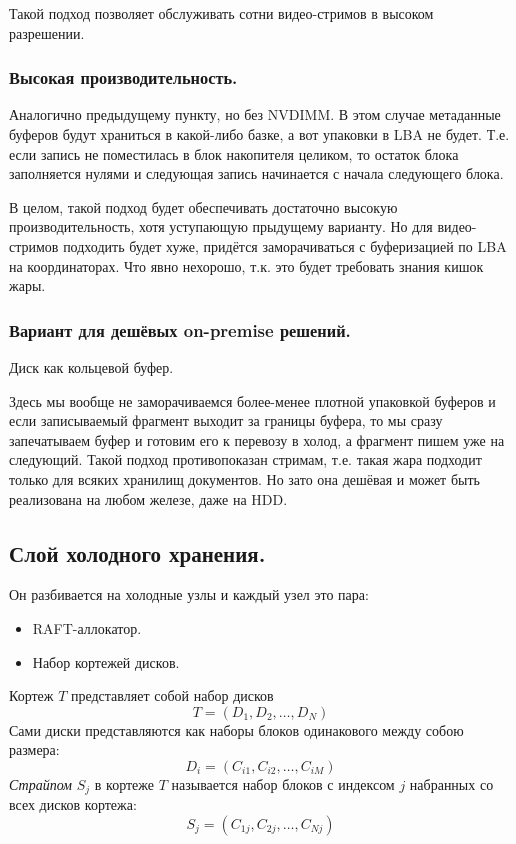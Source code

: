 \documentclass[a4paper,12pt]{article}
\begin{document}
\smallskip
Такой подход позволяет обслуживать сотни видео-стримов в высоком разрешении.

\subsubsection{Высокая производительность.}

Аналогично предыдущему пункту, но без NVDIMM. В этом случае метаданные буферов будут храниться в какой-либо базке, а вот упаковки в LBA не будет. Т.е. если запись не поместилась
в блок накопителя целиком, то остаток блока заполняется нулями и следующая запись начинается с начала следующего блока.

В целом, такой подход будет обеспечивать достаточно высокую производительность, хотя уступающую прыдущему варианту. Но для видео-стримов подходить будет хуже, придётся заморачиваться с
буферизацией по LBA на координаторах. Что явно нехорошо, т.к. это будет требовать знания кишок жары.

\subsubsection{Вариант для дешёвых on-premise решений.}

Диск как кольцевой буфер.
\smallskip

Здесь мы вообще не заморачиваемся более-менее плотной упаковкой буферов и если записываемый фрагмент выходит за границы буфера, то мы сразу запечатываем буфер и готовим его
к перевозу в холод, а фрагмент пишем уже на следующий. Такой подход противопоказан стримам, т.е. такая жара подходит только для всяких хранилищ документов. Но зато она дешёвая и может
быть реализована на любом железе, даже на HDD.

\subsection{Слой холодного хранения.}

Он разбивается на холодные узлы и каждый узел это пара:
\begin{itemize}
\item RAFT-аллокатор.
\item Набор кортежей дисков.
\end{itemize}

Кортеж $T$ представляет собой набор дисков
$$T=\left( D_1, D_2, \dots, D_N \right)$$
Сами диски представляются как наборы блоков одинакового между собою размера:
$$D_i = \left( C_{i1}, C_{i2}, \dots, C_{iM} \right)$$
\textit{Страйпом} $S_j$ в кортеже $T$ называется набор блоков с индексом $j$ набранных со всех дисков кортежа:
$$S_j = \left( C_{1j}, C_{2j}, \dots, C_{Nj} \right)$$
\end{document}

